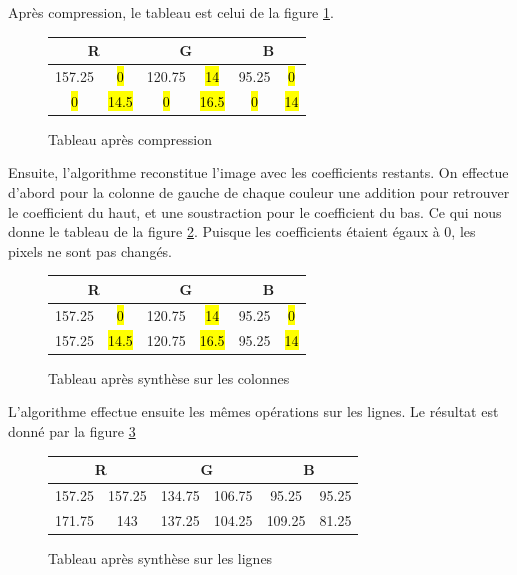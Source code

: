 \documentclass{article}
\begin{document}
Après compression, le tableau est celui de la figure \ref{tab4}.

\begin{figure}[!h]
\begin{center}
\begin{tabular}{|c|c|c|c|c|c|}
\hline
\multicolumn{2}{|c|}{R} & \multicolumn{2}{|c|}{G}  & \multicolumn{2}{|c|}{B} \\
\hline
157.25    & \hl{0}   &   120.75  & \hl{14} &   95.25  & \hl{0}   \\ 
\hline
\hl{0}    & \hl{14.5}   &   \hl{0}  & \hl{16.5} &   \hl{0}  & \hl{14} \\
\hline
\end{tabular}
\end{center}
\caption{Tableau après compression}
\label{tab4}
\end{figure}

Ensuite, l'algorithme reconstitue l'image avec les coefficients restants. On effectue d'abord pour la colonne de gauche de chaque couleur une addition pour retrouver le coefficient du haut, et une soustraction pour le coefficient du bas. Ce qui nous donne le tableau de la figure \ref{tab5}. Puisque les coefficients étaient égaux à 0, les pixels ne sont pas changés.

\begin{figure}[!h]
\begin{center}
\begin{tabular}{|c|c|c|c|c|c|}
\hline
\multicolumn{2}{|c|}{R} & \multicolumn{2}{|c|}{G}  & \multicolumn{2}{|c|}{B} \\
\hline
157.25    & \hl{0}   &   120.75  & \hl{14} &   95.25  & \hl{0}   \\ 
\hline
157.25    & \hl{14.5}   &   120.75  & \hl{16.5} &   95.25  & \hl{14} \\
\hline
\end{tabular}
\end{center}
\caption{Tableau après synthèse sur les colonnes}
\label{tab5}
\end{figure}

L'algorithme effectue ensuite les mêmes opérations sur les lignes. Le résultat est donné par la figure  \ref{tab6}

\begin{figure}[!h]
\begin{center}
\begin{tabular}{|c|c|c|c|c|c|}
\hline
\multicolumn{2}{|c|}{R} & \multicolumn{2}{|c|}{G}  & \multicolumn{2}{|c|}{B} \\
\hline
157.25    & 157.25   &   134.75  & 106.75 &   95.25  & 95.25   \\ 
\hline
171.75    & 143   &   137.25  & 104.25 &   109.25  & 81.25 \\
\hline
\end{tabular}
\end{center}
\caption{Tableau après synthèse sur les lignes}
\label{tab6}
\end{figure}
\end{document}
